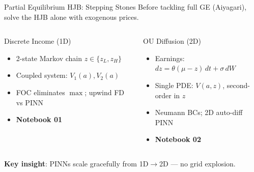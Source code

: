 \documentclass[aspectratio=169,11pt]{beamer}
\begin{document}

\begin{frame}{Partial Equilibrium HJB: Stepping Stones}
\small
Before tackling full GE (Aiyagari), solve the HJB alone with exogenous prices.

\begin{columns}[T]
\begin{block}{Discrete Income (1D)}
\begin{itemize}\itemsep1pt
  \item 2-state Markov chain $z\in\{z_L,z_H\}$
  \item Coupled system: $V_1(a), V_2(a)$
  \item FOC eliminates $\max$; upwind FD vs PINN
  \item \textbf{Notebook 01}
\end{itemize}
\end{block}

\begin{block}{OU Diffusion (2D)}
\begin{itemize}\itemsep1pt
  \item Earnings: $dz = \theta(\mu-z)\,dt + \sigma\,dW$
  \item Single PDE: $V(a,z)$, second-order in $z$
  \item Neumann BCs; 2D auto-diff PINN
  \item \textbf{Notebook 02}
\end{itemize}
\end{block}
\end{columns}

\vspace{0.3em}
\centering
\textbf{Key insight}: PINNs scale gracefully from 1D$\to$2D --- no grid explosion.
\end{frame}

\end{document}
